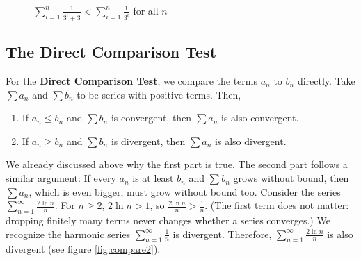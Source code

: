 \begin{figure}
    \centering
    \caption{$\sum_{i=1}^n \frac{1}{3^i + 3} < \sum_{i = 1}^n 
    \frac{1}{3^i}$ for all $n$}
    \label{fig:compare1}
\end{figure}
\subsection{The Direct Comparison Test}
For the \textbf{Direct Comparison Test}, we 
compare the terms $a_n$ to $b_n$ directly. Take $\sum a_n$ and $\sum b_n$ to 
be series with positive terms. Then, 
\begin{enumerate}
\item If $a_n \leq b_n$ and $\sum b_n$ is convergent, then $\sum a_n$ is 
also convergent.
\item If $a_n \geq b_n$ and $\sum b_n$ is divergent, then $\sum a_n$ is 
also divergent.
\end{enumerate}

We already discussed above why the first part is true. The second part follows 
a similar argument: If every $a_n$ is at least $b_n$ and $\sum b_n$ grows without bound,
then $\sum a_n$, which is even bigger, must grow without bound too. Consider the series $\sum_{n=1}^
\infty \frac{2\ln{n}}{n}$. For $n \geq 2$, $2\ln{n} > 1$, so $\frac{2\ln{n}}{n} > \frac{1}{n}$. (The first term
does not matter: dropping finitely many terms never changes whether a series
converges.) We recognize the harmonic series $\sum_{n=1}^
\infty \frac{1}{n}$ is divergent. Therefore, $\sum_{n=1}^\infty 
\frac{2\ln{n}}{n}$ is also divergent (see figure \ref{fig:compare2}).


